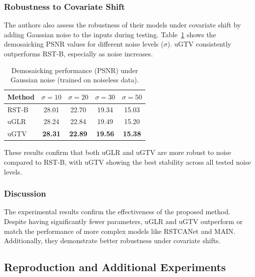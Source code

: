 \documentclass{article}
\theoremstyle{plain}
\theoremstyle{definition}
\theoremstyle{remark}
\begin{document}
\subsubsection{Robustness to Covariate Shift}

The authors also assess the robustness of their models under covariate shift by adding Gaussian noise to the inputs during testing. Table~\ref{tab:robustness} shows the demosaicking PSNR values for different noise levels ($\sigma$). uGTV consistently outperforms RST-B, especially as noise increases.
\begin{table}[t]
\caption{Demosaicking performance (PSNR) under Gaussian noise (trained on noiseless data).}
\label{tab:robustness}
\vskip -0.2in
\begin{center}
\begin{small}
\begin{sc}
\begin{tabular}{lcccc}
\toprule
\textbf{Method} & $\sigma=10$ & $\sigma=20$ & $\sigma=30$ & $\sigma=50$ \\
\midrule
RST-B & 28.01 & 22.70 & 19.34 & 15.03 \\
uGLR & 28.24 & 22.84 & 19.49 & 15.20 \\
uGTV & \textbf{28.31} & \textbf{22.89} & \textbf{19.56} & \textbf{15.38} \\
\bottomrule
\end{tabular}
\end{sc}
\end{small}
\end{center}
\vskip -0.2in
\end{table}

These results confirm that both uGLR and uGTV are more robust to noise compared to RST-B, with uGTV showing the best stability across all tested noise levels.

\subsubsection{Discussion}

The experimental results confirm the effectiveness of the proposed method. Despite having significantly fewer parameters, uGLR and uGTV outperform or match the performance of more complex models like RSTCANet and MAIN. Additionally, they demonstrate better robustness under covariate shifts.

\subsection{Reproduction and Additional Experiments}
\end{document}
